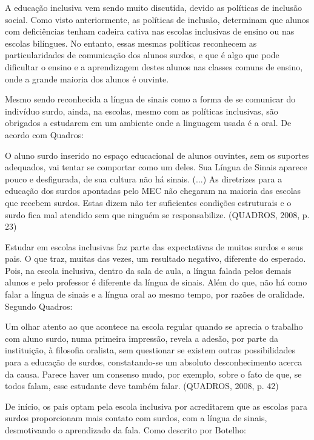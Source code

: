 \documentclass[brasil]{abnt}
\begin{document}
	A educação inclusiva vem sendo muito discutida, devido as políticas de inclusão social. Como visto anteriormente, as políticas de inclusão, determinam que alunos com deficiências tenham cadeira cativa 
	nas escolas inclusivas de ensino ou nas escolas bilíngues. No entanto, essas mesmas políticas reconhecem as particularidades de comunicação dos alunos surdos, e que é algo que pode dificultar o ensino e 
	a aprendizagem destes alunos nas classes comuns de ensino, onde a grande maioria dos alunos é ouvinte.
	
	Mesmo sendo reconhecida a língua de sinais como a forma de se comunicar do indivíduo surdo, ainda, na escolas, mesmo com as políticas inclusivas, são obrigados a estudarem em um ambiente onde
	a linguagem usada é a oral. De acordo com Quadros:
					
		\begin{citacao}O aluno surdo inserido no espaço educacional de alunos ouvintes, sem os suportes adequados, vai tentar se comportar como um deles. Sua Língua de Sinais aparece pouco e desfigurada, 
						de sua cultura não há sinais. (...) As diretrizes para a educação dos surdos apontadas pelo MEC não chegaram na maioria das escolas que recebem surdos. Estas dizem não ter suficientes 
						condições estruturais e o surdo fica mal atendido sem que ninguém se responsabilize. (QUADROS, 2008, p. 23)
		\end{citacao}
		
	Estudar em escolas inclusivas faz parte das expectativas de muitos surdos e seus pais. O que traz, muitas das vezes, um resultado negativo, diferente do esperado.
	Pois, na escola inclusiva, dentro da sala de aula, a língua falada pelos demais alunos e pelo professor é diferente da língua de sinais. Além do que, não há como falar
	a língua de sinais e a língua oral ao mesmo tempo, por razões de oralidade. Segundo Quadros:
	
		\begin{citacao} Um olhar atento ao que acontece na escola regular quando se aprecia o trabalho com aluno surdo, numa primeira impressão, revela a adesão, por parte
						da instituição, à filosofia oralista, sem questionar se existem outras possibilidades para a educação de surdos, constatando-se um absoluto 
						desconhecimento acerca da causa. Parece haver um consenso mudo, por exemplo, sobre o fato de que, se todos falam, esse estudante deve também falar.
						(QUADROS, 2008, p. 42)
		\end{citacao}
	
	De início, os pais optam pela escola inclusiva por acreditarem que as escolas para surdos proporcionam mais contato com surdos, com a língua de sinais, desmotivando o
	aprendizado da fala. Como descrito por Botelho:
	
\end{document}
